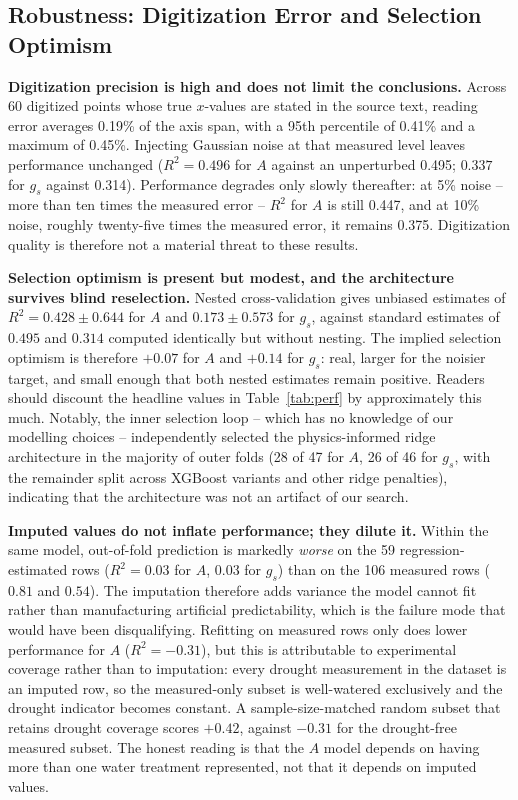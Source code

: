 \documentclass[runningheads]{llncs}
\begin{document}
\subsection{Robustness: Digitization Error and Selection Optimism}\label{sec:robustnessresults}

\textbf{Digitization precision is high and does not limit the conclusions.} Across 60 digitized points whose true $x$-values are stated in the source text, reading error averages 0.19\% of the axis span, with a 95th percentile of 0.41\% and a maximum of 0.45\%. Injecting Gaussian noise at that measured level leaves performance unchanged ($R^{2}=0.496$ for $A$ against an unperturbed 0.495; $0.337$ for $g_s$ against 0.314). Performance degrades only slowly thereafter: at 5\% noise -- more than ten times the measured error -- $R^{2}$ for $A$ is still 0.447, and at 10\% noise, roughly twenty-five times the measured error, it remains 0.375. Digitization quality is therefore not a material threat to these results.

\textbf{Selection optimism is present but modest, and the architecture survives blind reselection.} Nested cross-validation gives unbiased estimates of $R^{2}=0.428\pm0.644$ for $A$ and $0.173\pm0.573$ for $g_s$, against standard estimates of $0.495$ and $0.314$ computed identically but without nesting. The implied selection optimism is therefore $+0.07$ for $A$ and $+0.14$ for $g_s$: real, larger for the noisier target, and small enough that both nested estimates remain positive. Readers should discount the headline values in Table~\ref{tab:perf} by approximately this much. Notably, the inner selection loop -- which has no knowledge of our modelling choices -- independently selected the physics-informed ridge architecture in the majority of outer folds (28 of 47 for $A$, 26 of 46 for $g_s$, with the remainder split across XGBoost variants and other ridge penalties), indicating that the architecture was not an artifact of our search.

\textbf{Imputed values do not inflate performance; they dilute it.} Within the same model, out-of-fold prediction is markedly \emph{worse} on the 59 regression-estimated rows ($R^{2}=0.03$ for $A$, $0.03$ for $g_s$) than on the 106 measured rows ($0.81$ and $0.54$). The imputation therefore adds variance the model cannot fit rather than manufacturing artificial predictability, which is the failure mode that would have been disqualifying. Refitting on measured rows only does lower performance for $A$ ($R^{2}=-0.31$), but this is attributable to experimental coverage rather than to imputation: every drought measurement in the dataset is an imputed row, so the measured-only subset is well-watered exclusively and the drought indicator becomes constant. A sample-size-matched random subset that retains drought coverage scores $+0.42$, against $-0.31$ for the drought-free measured subset. The honest reading is that the $A$ model depends on having more than one water treatment represented, not that it depends on imputed values.
\end{document}
